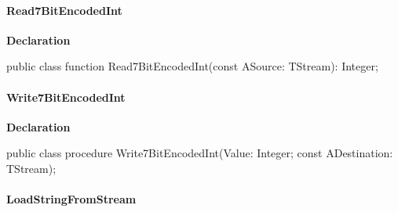 \documentclass{report}
\newif\ifpdf
\begin{document}
\paragraph*{Read7BitEncodedInt}\hspace*{\fill}

\label{PasDoc_Serialize.TSerializable-Read7BitEncodedInt}
\begin{list}{}{
\setlength{\itemindent}{0cm}
\setlength{\listparindent}{0cm}
\setlength{\leftmargin}{\evensidemargin}
\addtolength{\leftmargin}{\tmplength}
\settowidth{\labelsep}{X}
\addtolength{\leftmargin}{\labelsep}
\setlength{\labelwidth}{\tmplength}
}
\item[\textbf{Declaration}\hfill]
\ifpdf
\begin{flushleft}
\fi
\begin{ttfamily}
public class function Read7BitEncodedInt(const ASource: TStream): Integer;\end{ttfamily}

\ifpdf
\end{flushleft}
\fi

\end{list}
\paragraph*{Write7BitEncodedInt}\hspace*{\fill}

\label{PasDoc_Serialize.TSerializable-Write7BitEncodedInt}
\begin{list}{}{
\setlength{\itemindent}{0cm}
\setlength{\listparindent}{0cm}
\setlength{\leftmargin}{\evensidemargin}
\addtolength{\leftmargin}{\tmplength}
\settowidth{\labelsep}{X}
\addtolength{\leftmargin}{\labelsep}
\setlength{\labelwidth}{\tmplength}
}
\item[\textbf{Declaration}\hfill]
\ifpdf
\begin{flushleft}
\fi
\begin{ttfamily}
public class procedure Write7BitEncodedInt(Value: Integer; const ADestination: TStream);\end{ttfamily}

\ifpdf
\end{flushleft}
\fi

\end{list}
\paragraph*{LoadStringFromStream}\hspace*{\fill}
\end{document}
